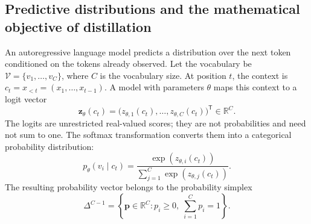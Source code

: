 \subsection{Predictive distributions and the mathematical objective of distillation}
\label{subsec:distillation-probabilistic-foundation}

An autoregressive language model predicts a distribution over the next token
conditioned on the tokens already observed.  Let the vocabulary be
\(\mathcal V=\{v_1,\ldots,v_C\}\), where \(C\) is the vocabulary
size.  At position \(t\), the context is
\(c_t=x_{<t}=(x_1,\ldots,x_{t-1})\).  A model with parameters
\(\theta\) maps this context to a logit vector
\begin{equation}
    \mathbf z_\theta(c_t)
    =\bigl(z_{\theta,1}(c_t),\ldots,z_{\theta,C}(c_t)\bigr)^{\mathsf T}
    \in\mathbb R^C.
    \label{eq:distillation-logit-vector}
\end{equation}
The logits are unrestricted real-valued scores; they are not probabilities
and need not sum to one.  The softmax transformation converts them into a
categorical probability distribution:
\begin{equation}
    p_\theta(v_i\mid c_t)
    =\frac{\exp(z_{\theta,i}(c_t))}
    {\displaystyle\sum_{j=1}^{C}\exp(z_{\theta,j}(c_t))}.
    \label{eq:distillation-softmax}
\end{equation}
The resulting probability vector belongs to the probability simplex
\begin{equation}
    \Delta^{C-1}
    =\left\{\mathbf p\in\mathbb R^C:
    p_i\geq 0,\;\sum_{i=1}^{C}p_i=1\right\}.
    \label{eq:distillation-simplex}
\end{equation}

